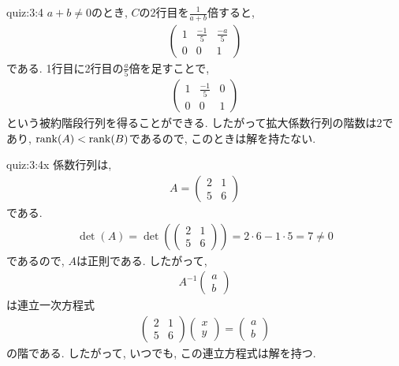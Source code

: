 \begin{answerof}{quiz:3:4}
  $a+b\neq 0$のとき,
    $C$の2行目を$\frac{1}{a+b}$倍すると,
  \begin{align*}
    \begin{pmatrix}1&\frac{-1}{5}&\frac{-a}{5}\\0&0&1\end{pmatrix}
  \end{align*}
  である.
  1行目に2行目の$\frac{a}{5}$倍を足すことで,
  \begin{align*}
    \begin{pmatrix}1&\frac{-1}{5}&0\\0&0&1\end{pmatrix}
  \end{align*}
  という被約階段行列を得ることができる.
  したがって拡大係数行列の階数は2であり,
  $\operatorname{rank}(A)<\operatorname{rank}(B)$であるので,
  このときは解を持たない.
\end{answerof}


\begin{answerof}{quiz:3:4x}
  係数行列は,
  \begin{align*}
    A=\begin{pmatrix}2&1\\5&6\end{pmatrix}
  \end{align*}
  である.
  \begin{align*}
    \det(A)=\det(\begin{pmatrix}2&1\\5&6\end{pmatrix})=2\cdot6-1\cdot 5=7\neq 0
  \end{align*}
  であるので, $A$は正則である.
  したがって,
  \begin{align*}
      A^{-1}\begin{pmatrix}a\\b\end{pmatrix}
  \end{align*}
  は連立一次方程式
  \begin{align*}
    \begin{pmatrix}2&1\\5&6\end{pmatrix}
    \begin{pmatrix}x\\y\end{pmatrix}
      =
      \begin{pmatrix}a\\b\end{pmatrix}
  \end{align*}
  の階である.
  したがって,
  いつでも,
  この連立方程式は解を持つ.
\end{answerof}

